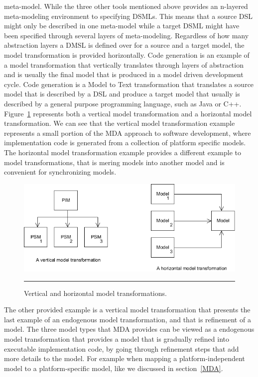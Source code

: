 meta-model. While the three other tools mentioned above provides an n-layered
meta-modeling environment to specifying DSMLs. This means that a source DSL
might only be described in one meta-model while a target DSML might have been
specified through several layers of meta-modeling. Regardless of how many
abstraction layers a DMSL is defined over for a source and a target model, the
model transformation is provided horizontally. Code generation is an example of
a model transformation that vertically translates through layers of abstraction
and is usually the final model that is produced in a model driven development
cycle. Code generation is a Model to Text transformation that translates a
source model that is described by a DSL and produce a target model that usually
is described by a general purpose programming language, such as Java or C++.
Figure~\ref{fig:vertical_horizontal} represents both a vertical model
transformation and a horizontal model transformation. We can see that the
vertical model transformation example represents a small portion of the MDA
approach to software development, where implementation code is generated from a
collection of platform specific models. The horizontal model transformation
example provides a different example to model transformations, that is mering
models into another model and is convenient for synchronizing models.

\begin{figure}[H]
  \centering
    \includegraphics[scale=0.8]{./Figures/vertical_horizontal.png}
    \rule{35em}{0.5pt}
  \caption[Vertical and Horizontal model transformations]
  {Vertical and horizontal model transformations.}
  \label{fig:vertical_horizontal}
\end{figure}

The other provided example is a vertical model transformation that presents the
last example of an endogenous model transformation, and that is refinement of a
model. The three model types that MDA provides
can be viewed as a endogenous model transformation that provides a model that
is gradually refined into executable implementation code, by going through
refinement steps that add more details to the model. For example when mapping a
platform-independent model to a platform-specific model, like we discussed in
section~\ref{MDA}. 

